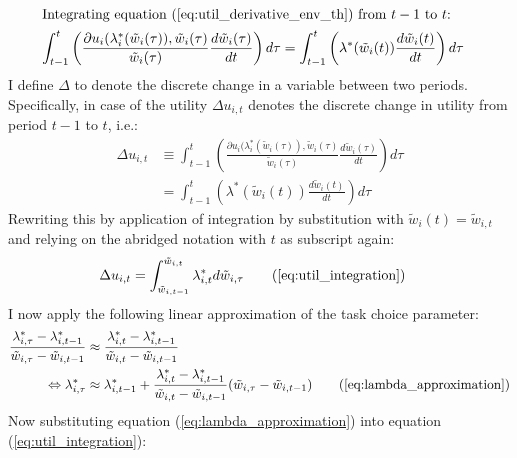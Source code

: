\documentclass[../main.tex]{subfiles}
\begin{document}
\begin{align}
	\intertext{Integrating equation (\ref{eq:util_derivative_env_th}) from $t-1$ to $t$:}
	\int^{t}_{t-1} \left( \frac{\partial u_{i}(\lambda_{i}^*(\tilde{w}_{i}(\tau)), \tilde{w}_{i}(\tau)}{\tilde{w}_{i}(\tau)} \frac{d\tilde{w}_i(\tau)}{dt}\right) d\tau &= \int^{t}_{t-1} \left(\lambda^*(\tilde{w}_i(t)) \frac{d \tilde{w}_i (t)}{d t} \right) d\tau \nonumber
\end{align}
I define $\Delta$ to denote the discrete change in a variable between two periods. Specifically, in case of the utility $\Delta u_{i,t}$ denotes the discrete change in utility from period $t-1$ to $t$, i.e.:
\begin{align} \label{appen:definition_delta}
	\Delta u_{i,t} &\equiv \int^{t}_{t-1} \left( \frac{\partial u_{i}(\lambda_{i}^*(\tilde{w}_{i}(\tau)), \tilde{w}_{i}(\tau)}{\tilde{w}_{i}(\tau)} \frac{d\tilde{w}_i(\tau)}{dt}\right) d\tau \nonumber \\
	{} &= \int^{t}_{t-1} \left(\lambda^*(\tilde{w}_i(t)) \frac{d \tilde{w}_i (t)}{d t} \right) d\tau \nonumber
\end{align}
Rewriting this by application of integration by substitution with $\tilde{w}_i(t) = \tilde{w}_{i,t}$ and relying on the abridged notation with $t$ as subscript again:
\begin{align}
\Delta u_{i,t} &= \int^{\tilde{w}_{i,t}}_{\tilde{w}_{i,t-1}} \lambda_{i,t}^* d\tilde{w}_{i,\tau} \tag{\ref{eq:util_integration}}
\end{align}
I now apply the following linear approximation of the task choice parameter:
\begin{align}
	\frac{\lambda_{i,\tau}^* - \lambda_{i,t-1}^*}{\tilde{w}_{i,\tau} - \tilde{w}_{i,t-1}} &\approx \frac{\lambda_{i,t}^* - \lambda_{i,t-1}^*}{\tilde{w}_{i,t} - \tilde{w}_{i,t-1}} \nonumber \\
	\Leftrightarrow \lambda_{i,\tau}^* &\approx \lambda_{i,t-1}^* + \frac{\lambda_{i,t}^* - \lambda_{i,t-1}^*}{\tilde{w}_{i,t} - \tilde{w}_{i,t-1}} (\tilde{w}_{i,\tau} - \tilde{w}_{i,t-1}) \tag{\ref{eq:lambda_approximation}}
\end{align}
Now substituting equation (\ref{eq:lambda_approximation}) into equation (\ref{eq:util_integration}):
\end{document}

